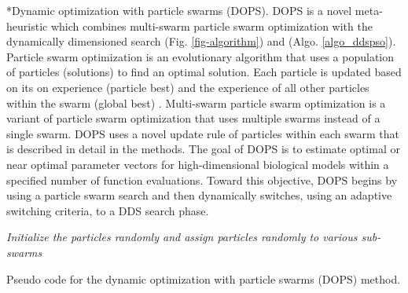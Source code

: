 \documentclass[12pt]{article}
\makeatletter
\renewcommand\subsection{\@startsection
	{subsection}{2}{0mm}
	{-0.05in}
	{-0.5\baselineskip}
	{\normalfont\normalsize\bfseries}}
\makeatother
\begin{document}
\subsection*{Dynamic optimization with particle swarms (DOPS).}
DOPS is a novel meta-heuristic which combines multi-swarm particle swarm optimization
with the dynamically dimensioned search (Fig. \ref{fig-algorithm}) and (Algo. \ref{algo_ddspso}).  Particle swarm optimization is an evolutionary algorithm that uses a population of particles (solutions) to find an optimal solution.
Each particle is updated based on its on experience (particle best) and the experience of all other particles within the swarm (global best) \cite{clerc2010particle}\cite{blondin2009particle}\cite{abraham2006swarm}.   
Multi-swarm particle swarm optimization is a variant of particle swarm optimization that uses multiple swarms instead of a single swarm.
DOPS uses a novel update rule of particles within each swarm that is described in detail in the methods.
The goal of DOPS is to estimate optimal or near optimal parameter vectors for high-dimensional biological models within a specified number of function evaluations.
Toward this objective, DOPS begins by using a particle swarm search and then dynamically switches, using an adaptive switching criteria, to a DDS search phase.

\IncMargin{1em}
\begin{algorithm}
\BlankLine
\emph{Initialize the particles randomly and assign particles randomly to various sub-swarms}\;
\caption{Pseudo code for the dynamic optimization with particle swarms (DOPS) method.}\label{algo_ddspso}
\end{algorithm}\DecMargin{1em}
\end{document}

